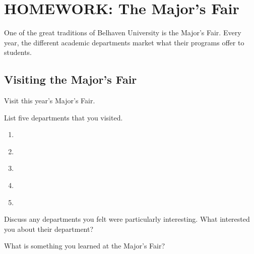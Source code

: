 
\section{HOMEWORK: The Major's Fair}

One of the great traditions of Belhaven University is the Major's Fair. Every year, the different academic departments market what their programs offer to students.

\subsection{Visiting the Major's Fair}

\begin{exercise}
Visit this year's Major's Fair.
\end{exercise}


\begin{exercise}
List five departments that you visited.
\end{exercise}

\begin{enumerate}
    \item \hspace{.5in} \\
    \item \hspace{.5in} \\
    \item \hspace{.5in} \\
    \item \hspace{.5in} \\
    \item \hspace{.5in}
\end{enumerate}

\begin{exercise}
Discuss any departments you felt were particularly interesting. What interested you about their department?
\end{exercise}

\blanks
\blanks

\begin{exercise}
What is something you learned at the Major's Fair?
\end{exercise}

\blanks
\blanks

